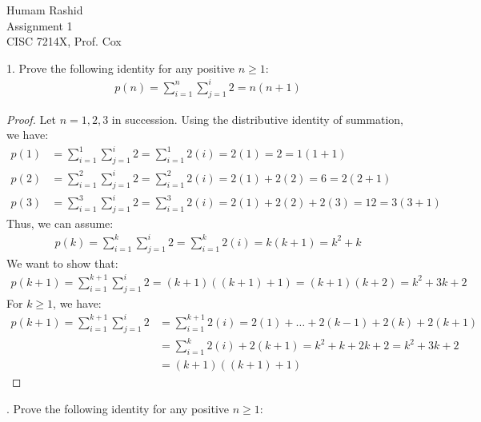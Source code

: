 \documentclass{scrartcl}
\begin{document}
\begin{flushleft}

    Humam Rashid\\
    Assignment 1\\
    CISC 7214X, Prof. Cox\\
    \bigskip
    
    1. Prove the following identity for any positive $n \geq 1$:
    \begin{align*}
        p(n) = \sum_{i=1}^{n}\sum_{j=1}^{i} 2 = n (n + 1)
    \end{align*}
    \begin{proof}
        Let $n = 1,2,3$ in succession. Using the distributive identity of summation, we have:
        \begin{align*}
            p(1) &= \sum_{i=1}^{1}\sum_{j=1}^{i} 2 = \sum_{i=1}^{1} 2(i) = 2(1) = 2 = 1(1 + 1)\\
            p(2) &= \sum_{i=1}^{2}\sum_{j=1}^{i} 2 = \sum_{i=1}^{2} 2(i) = 2(1) + 2(2) = 6
            = 2(2 + 1)\\
            p(3) &= \sum_{i=1}^{3}\sum_{j=1}^{i} 2 = \sum_{i=1}^{3} 2(i) = 2(1) + 2(2) + 2(3) = 12
            = 3(3 + 1)
            \tag{1}
        \end{align*}
        Thus, we can assume:
        \begin{align*}
            p(k) = \sum_{i=1}^{k}\sum_{j=1}^{i} 2 = \sum_{i=1}^{k} 2(i) = k(k + 1) = k^2 + k
            \tag{2}
        \end{align*}
        We want to show that:
        \begin{align*}
            p(k + 1) = \sum_{i=1}^{k + 1}\sum_{j=1}^{i} 2 = (k + 1) ((k + 1) + 1) = (k + 1) (k + 2) = k^2 + 3k + 2
        \end{align*}
        For $k \geq 1$, we have:
        \begin{align*}
            p(k + 1) = \sum_{i=1}^{k + 1}\sum_{j=1}^{i} 2 &= \sum_{i=1}^{k+1} 2(i) = 2(1) + \ldots
            + 2(k - 1) + 2(k) + 2(k + 1) \\
            &= \sum_{i=1}^{k} 2(i) + 2(k + 1) = k^2 + k + 2k + 2 = k^2 + 3k + 2 \\
            &= (k + 1) ((k + 1) + 1)
            \tag{3}
        \end{align*}
    \end{proof}
    . Prove the following identity for any positive $n \geq 1$:

\end{flushleft}
\end{document}
